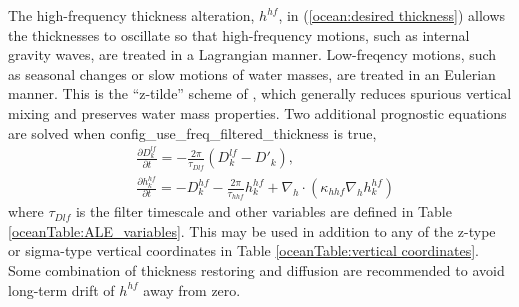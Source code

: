 The high-frequency thickness alteration, $h^{hf}$, in (\ref{ocean:desired thickness}) allows the thicknesses to oscillate so that high-frequency motions, such as internal gravity waves, are treated in a Lagrangian manner.  Low-freqency motions, such as seasonal changes or slow motions of water masses, are treated in an Eulerian manner.  This is the ``z-tilde'' scheme of \citet{Leclair_Madec11om}, which generally reduces spurious vertical mixing and preserves water mass properties.  Two additional prognostic equations are solved when config\_use\_freq\_filtered\_thickness is true,
\begin{eqnarray}
\label{ocean:Dlf}
 & \displaystyle
  \frac{\partial D^{lf}_k}{\partial t} = - \frac{2\pi}{\tau_{Dlf}} \left( D^{lf}_k - D'_k \right), 
\\ & \displaystyle
\label{ocean:hhf}
\frac{\partial h^{hf}_k}{\partial t} =  - D^{hf}_k - \frac{2\pi}{\tau_{hhf}} h^{hf}_k + \nabla_h\cdot \left( \kappa_{hhf} \nabla_h h^{hf}_k \right) 
\end{eqnarray}
where $\tau_{Dlf}$ is the filter timescale and other variables are defined in Table \ref{oceanTable:ALE_variables}.  This may be used in addition to any of the z-type or sigma-type vertical coordinates in Table \ref{oceanTable:vertical coordinates}.  Some combination of thickness restoring and diffusion are recommended to avoid long-term drift of $h^{hf}$ away from zero.



